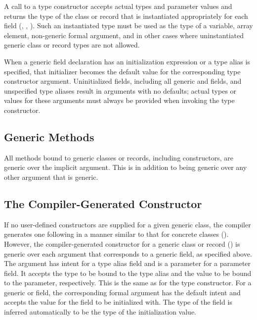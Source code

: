 A call to a type constructor accepts actual types and parameter values
and returns the type of the class or record that is instantiated
appropriately for each field
(, ,
).
Such an instantiated type must be used as the type of a variable,
array element, non-generic formal argument, and in other cases
where uninstantiated generic class or record types are not allowed.

When a generic field declaration has an initialization expression
or a type alias is specified, that initializer becomes the default value
for the corresponding type constructor argument.  Uninitialized
fields, including all generic  and  fields,
and unspecified type aliases result in arguments with no defaults;
actual types or values for these arguments must always be provided
when invoking the type constructor.

\subsection{Generic Methods}
\label{Generic_Methods}

All methods bound to generic classes or records, including
constructors, are generic over the implicit  argument.
This is in addition to being generic over any other argument that is generic.

\subsection{The Compiler-Generated Constructor}
\label{Generic_Compiler_Generated_Constructors}

If no user-defined constructors are supplied for a given generic class, the
compiler generates one following in a manner similar to that for concrete
classes ().
However, the compiler-generated constructor for a generic class or record
() is generic over each argument that
corresponds to a generic field, as specified above.
The argument has intent  for a type alias field and is a
parameter for a parameter field. It accepts the type to be bound
to the type alias and the value to be bound to the parameter, respectively.
This is the same as for the type constructor.
For a generic  or  field, the corresponding
formal argument has the default intent and accepts the value
for the field to be initialized with. The type of the field
is inferred automatically to be the type of the initialization value.

